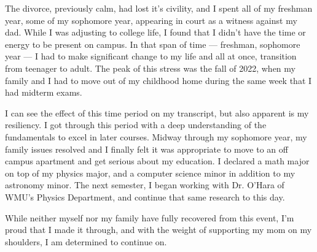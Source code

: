 \documentclass[11pt]{article}
\begin{document}
The divorce, previously calm, had lost it's civility, and I spent all of my freshman year, some of my sophomore year, appearing in court as a witness against my dad. While I was adjusting to college life, I found that I didn't have the time or energy to be present on campus. In that span of time --- freshman, sophomore year --- I had to make significant change to my life and all at once, transition from teenager to adult. The peak of this stress was the fall of 2022, when my family and I had to move out of my childhood home during the same week that I had midterm exams.

I can see the effect of this time period on my transcript, but also apparent is my resiliency. I got through this period with a deep understanding of the fundamentals to excel in later courses. Midway through my sophomore year, my family issues resolved and I finally felt it was appropriate to move to an off campus apartment and get serious about my education. I declared a math major on top of my physics major, and a computer science minor in addition to my astronomy minor. The next semester, I began working with Dr. O'Hara of WMU's Physics Department, and continue that same research to this day.

While neither myself nor my family have fully recovered from this event, I'm proud that I made it through, and with the weight of supporting my mom on my shoulders, I am determined to continue on.
\end{document}
